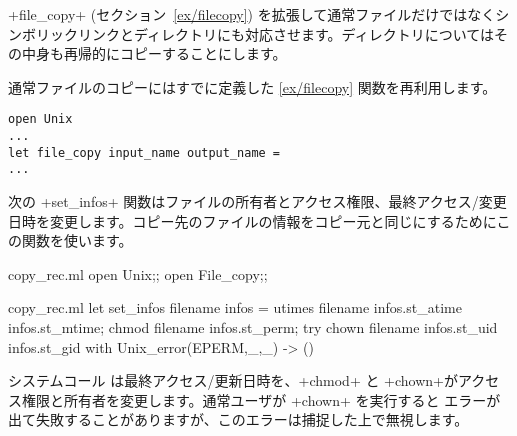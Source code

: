 \ml+file_copy+ (セクション~\ref{ex/filecopy}) を拡張して通常ファイルだけではなくシンボリックリンクとディレクトリにも対応させます。ディレクトリについてはその中身も再帰的にコピーすることにします。

通常ファイルのコピーにはすでに定義した \ref{ex/filecopy} 関数を再利用します。
\begin{lstlisting}
open Unix
...
let file_copy input_name output_name =
...
\end{lstlisting}
次の \ml+set_infos+ 関数はファイルの所有者とアクセス権限、最終アクセス/変更日時を変更します。コピー先のファイルの情報をコピー元と同じにするためにこの関数を使います。
%
\begin{codefile}{copy_rec.ml}
open Unix;;
open File_copy;;
\end{codefile}
%
\begin{listingcodefile}{copy_rec.ml}
let set_infos filename infos =
  utimes filename infos.st_atime infos.st_mtime;
  chmod filename infos.st_perm;
  try
    chown filename infos.st_uid infos.st_gid
  with Unix_error(EPERM,_,_) -> ()
\end{listingcodefile}
%
システムコール  は最終アクセス/更新日時を、\ml+chmod+ と \ml+chown+がアクセス権限と所有者を変更します。通常ユーザが \ml+chown+ を実行すると  エラーが出て失敗することがありますが、このエラーは捕捉した上で無視します。

